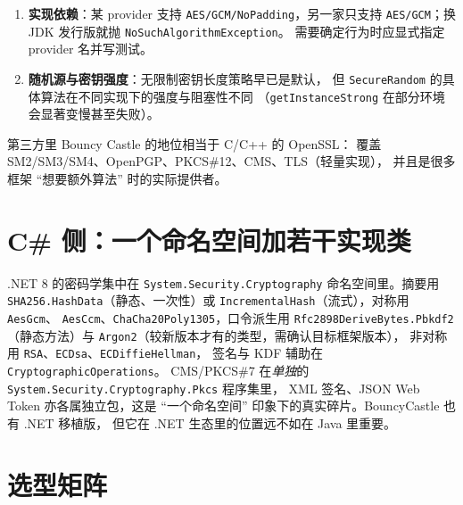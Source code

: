 \documentclass[12pt,a4paper,fontset=fandol]{ctexbook}
\newcommand{\Tp}[1]{\texttt{#1}}
\newcommand{\CSharp}{C\#}
\newcommand{\CppJava}{C/C++}
\begin{document}
\begin{enumerate}
  \item \textbf{实现依赖}：某 provider 支持
        \texttt{AES/GCM/NoPadding}，另一家只支持
        \texttt{AES/GCM}；换 JDK 发行版就抛
        \Tp{NoSuch\allowbreak Algorithm\allowbreak Exception}。
        需要确定行为时应显式指定 provider 名并写测试。
  \item \textbf{随机源与密钥强度}：无限制密钥长度策略早已是默认，
        但 \Tp{SecureRandom} 的具体算法在不同实现下的强度与阻塞性不同
        （\Tp{getInstanceStrong} 在部分环境会显著变慢甚至失败）。
\end{enumerate}

第三方里 Bouncy Castle 的地位相当于 \CppJava{} 的 OpenSSL：
覆盖 SM2/SM3/SM4、OpenPGP、PKCS\#12、CMS、TLS（轻量实现），
并且是很多框架 ``想要额外算法'' 时的实际提供者。

\section{\CSharp{} 侧：一个命名空间加若干实现类}

.NET 8 的密码学集中在
\Tp{System.\allowbreak Security.\allowbreak Cryptography}
命名空间里。摘要用 \Tp{SHA256.\allowbreak Hash\allowbreak{}Data}（静态、一次性）或
\Tp{Incremental\allowbreak Hash}（流式），对称用 \Tp{AesGcm}、
\Tp{AesCcm}、\Tp{Cha\allowbreak{}Cha20\allowbreak Poly1305}，口令派生用
\Tp{Rfc2898\allowbreak Derive\allowbreak{}Bytes\allowbreak.\allowbreak{}Pbkdf2}（静态方法）与
\Tp{Argon2}（较新版本才有的类型，需确认目标框架版本），
非对称用 \Tp{RSA}、\Tp{ECDsa}、\Tp{ECDiffie\allowbreak Hellman}，
签名与 KDF 辅助在 \Tp{Cryptographic\allowbreak Operations}。
CMS/PKCS\#7 在\emph{单独}的
\Tp{System.\allowbreak{}Security.\allowbreak Cryptography.\allowbreak{}Pkcs} 程序集里，
XML 签名、JSON Web Token 亦各属独立包，这是 ``一个命名空间''
印象下的真实碎片。BouncyCastle 也有 .NET 移植版，
但它在 .NET 生态里的位置远不如在 Java 里重要。

\section{选型矩阵}
\end{document}
